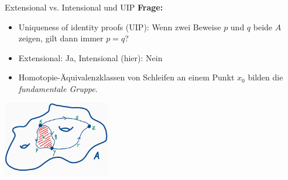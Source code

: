 \documentclass[11pt,aspectratio=169,notheorems]{beamer}
\begin{document}
\begin{frame}{Extensional vs. Intensional und UIP}
    \textbf{Frage:}
    \begin{itemize}
        \item \glqq{}Uniqueness of identity proofs\grqq{} (UIP): Wenn zwei Beweise $p$ und $q$ beide $A$ zeigen, gilt dann immer $p = q$?
        \item Extensional: Ja, Intensional (hier): Nein
        \item Homotopie-Äquivalenzklassen von Schleifen an einem Punkt $x_0$ bilden die \emph{fundamentale Gruppe}.
    \end{itemize}
    \begin{center}
        \includegraphics[width=0.35\textwidth]{images/topology1.pdf}
    \end{center}
\end{frame}
\end{document}
